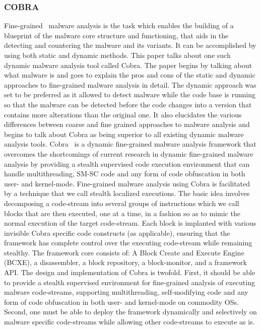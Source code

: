\documentclass[11pt]{article}
\begin{document}
		\subsubsection{COBRA}
		Fine-grained ~\cite{vasudevan2006cobra}malware analysis is the task which enables the building of a blueprint of the malware core structure and functioning, that aids in the detecting and countering the malware and its variants. It can be accomplished by using both static and dynamic methods. This paper talks about one such dynamic malware analysis tool called Cobra.
		The paper begins by talking about what malware is and goes to explain the pros and cons of the static and dynamic approaches to fine-grained malware analysis in detail. The dynamic approach was set to be preferred as it allowed to detect malware while the code base is running so that the malware can be detected before the code changes into a version that contains more alterations than the original one. It also elucidates the various differences between coarse and fine grained approaches to malware analysis and begins to talk about Cobra as being superior to all existing dynamic malware analysis tools.
		Cobra~\cite{vasudevan2006cobra} is a dynamic fine-grained malware analysis framework that overcomes the shortcomings of current research in dynamic fine-grained malware analysis by providing a stealth supervised code execution environment that can handle multithreading, SM-SC code and any form of code obfuscation in both user- and kernel-mode. 
		Fine-grained malware analysis using Cobra is facilitated by a technique that we call stealth localized executions. The basic idea involves decomposing a code-stream into several groups of instructions which we call blocks that are then executed, one at a time, in a fashion so as to mimic the normal execution of the target code-stream. Each block is implanted with various invisible Cobra specific code constructs (as applicable), ensuring that the framework has complete control over the executing code-stream while remaining stealthy.	
		The framework core consists of: A Block Create and Execute Engine (BCXE), a disassembler, a block repository, a block-monitor, and a framework API. The design and implementation of Cobra is twofold. First, it should be able to provide a stealth supervised environment for fine-grained analysis of executing malware code-streams, supporting multithreading, self-modifying code and any form of code obfuscation in both user- and kernel-mode on commodity OSs. Second, one must be able to deploy the framework dynamically and selectively on malware specific code-streams while allowing other code-streams to execute as is. 
\end{document}
